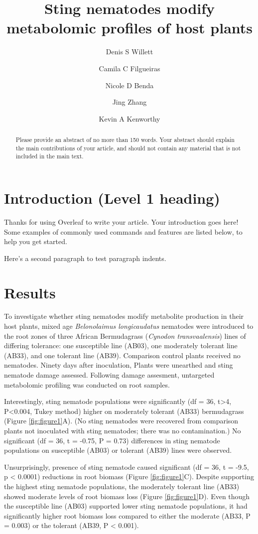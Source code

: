 \documentclass[9pt,lineno]{elife}
\title{Sting nematodes modify metabolomic profiles of host plants}
\author[1*,\authfn{1}]{Denis S Willett}
\author[1,\authfn{1}]{Camila C Filgueiras}
\author[2]{Nicole D Benda}
\author[2]{Jing Zhang}
\author[3]{Kevin A Kenworthy}
\affil[1]{Applied Chemical Ecology Technology, Department of Entomology, Cornell AgriTech}
\affil[2]{Entomology and Nemotalogy Department, University of Florida}
\affil[3]{Agronomy Department, University of Florida}
\begin{document}
\maketitle

\begin{abstract}
Please provide an abstract of no more than 150 words. Your abstract should explain the main contributions of your article, and should not contain any material that is not included in the main text.
\end{abstract}


\section{Introduction (Level 1 heading)}

Thanks for using Overleaf to write your article. Your introduction goes here! Some examples of commonly used commands and features are listed below, to help you get started.

Here's a second paragraph to test paragraph indents. \lipsum[1]

\section{Results}

To investigate whether sting nematodes modify metabolite production in their host plants, mixed age \textit{Belonolaimus longicaudatus} nematodes were introduced to the root zones of three African Bermudagrass (\textit{Cynodon transvaalensis}) lines of differing tolerance: one susceptible line (AB03), one moderately tolerant line (AB33), and one tolerant line (AB39).  Comparison control plants received no nematodes.  Ninety days after inoculation,  Plants were unearthed and sting nematode damage assessed.  Following damage assesment, untargeted metabolomic profiling was conducted on root samples.  

Interestingly, sting nematode populations were significantly (df = 36, t>4, P<0.004, Tukey method) higher on moderately tolerant (AB33) bermudagrass (Figure \ref{fig:figure1}A).  (No sting nematodes were recovered from comparison plants not inoculated with sting nematodes; there was no contamination.)  No significant (df = 36, t = -0.75, P = 0.73) differences in sting nematode populations on susceptible (AB03) or tolerant (AB39) lines were observed.  

Unsurprisingly, presence of sting nematode caused significant (df = 36, t = -9.5, p < 0.0001) reductions in root biomass (Figure \ref{fig:figure1}C).  Despite supporting the highest sting nematode populations, the moderately tolerant line (AB33) showed moderate levels of root biomass loss (Figure \ref{fig:figure1}D). Even though the susceptible line (AB03) supported lower sting nematode populations, it had significantly higher root biomass loss compared to either the moderate (AB33, P = 0.003) or the tolerant (AB39, P < 0.001).  
\end{document}
